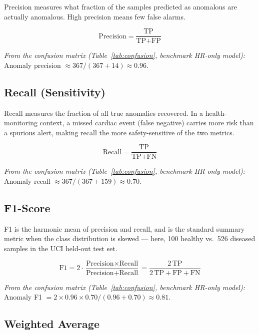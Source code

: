 Precision measures what fraction of the samples predicted as anomalous
are actually anomalous. High precision means few false alarms.

\begin{equation}
\label{eq:precision}
  \text{Precision} = \frac{\text{TP}}{\text{TP} + \text{FP}}
\end{equation}

\textit{From the confusion matrix (Table~\ref{tab:confusion}, benchmark HR-only model):} Anomaly precision $\approx 367/(367+14) \approx 0.96$.

\subsection*{Recall (Sensitivity)}

Recall measures the fraction of all true anomalies recovered. In a health-monitoring context, a missed cardiac event (false negative) carries more risk than a spurious alert, making recall the more safety-sensitive of the two metrics.

\begin{equation}
\label{eq:recall}
  \text{Recall} = \frac{\text{TP}}{\text{TP} + \text{FN}}
\end{equation}

\textit{From the confusion matrix (Table~\ref{tab:confusion}, benchmark HR-only model):} Anomaly recall $\approx 367/(367+159) \approx 0.70$.

\subsection*{F1-Score}

F1 is the harmonic mean of precision and recall, and is the standard summary metric when the class distribution is skewed --- here, 100 healthy vs.\ 526 diseased samples in the UCI held-out test set.

\begin{equation}
\label{eq:f1}
  \text{F1} = 2 \cdot \frac{\text{Precision} \times \text{Recall}}
                             {\text{Precision} + \text{Recall}}
            = \frac{2\,\text{TP}}{2\,\text{TP} + \text{FP} + \text{FN}}
\end{equation}

\textit{From the confusion matrix (Table~\ref{tab:confusion}, benchmark HR-only model):} Anomaly F1 $= 2 \times 0.96 \times 0.70 /
(0.96 + 0.70) \approx 0.81$.

\subsection*{Weighted Average}

